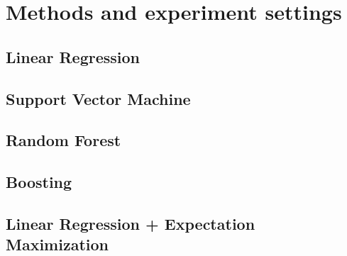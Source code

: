 \section{Methods and experiment settings}
\label{sec:experiments}

\subsection{Linear Regression}

\subsection{Support Vector Machine}

\subsection{Random Forest}

\subsection{Boosting}

\subsection{Linear Regression + Expectation Maximization}